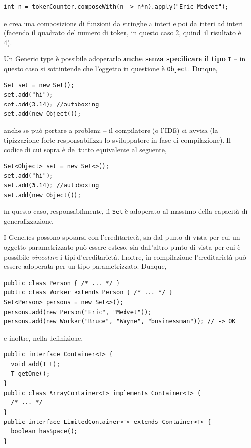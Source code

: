 \documentclass[\fontsizeclass,twocolumn]{\classname}
\let\oldtextsc\textsc
\renewcommand{\textsc}[1]{\oldtextsc{\scfontfs #1}}
\theoremstyle{definition}
\theoremstyle{definition}
\begin{document}
\begin{lstlisting}
int n = tokenCounter.composeWith(n -> n*n).apply("Eric Medvet");
\end{lstlisting}

e crea una composizione di funzioni da stringhe a interi e poi da interi ad
interi (facendo il quadrato del numero di token, in questo caso 2, quindi il
risultato è 4).

Un Generic type è possibile adoperarlo \textbf{anche senza specificare il tipo
\texttt{T}} -- in questo caso si sottintende che l'oggetto in questione è
\texttt{Object}. Dunque,

\begin{lstlisting}
Set set = new Set();
set.add("hi");
set.add(3.14); //autoboxing
set.add(new Object());
\end{lstlisting}

anche se può portare a problemi -- il compilatore (o l'\textsc{IDE}) ci avvisa (la
tipizzazione forte responsabilizza lo sviluppatore in fase di compilazione). Il
codice di cui sopra è del tutto equivalente al seguente,

\begin{lstlisting}
Set<Object> set = new Set<>();
set.add("hi");
set.add(3.14); //autoboxing
set.add(new Object());
\end{lstlisting}

in questo caso, responsabilmente, il \texttt{Set} è adoperato al massimo della
capacità di generalizzazione.

I Generics possono sposarsi con l'ereditarietà, sia dal punto di vista per cui
un oggetto parametrizzato può essere esteso, sia dall'altro punto di vista per
cui è possibile \emph{vincolare} i tipi d'ereditarietà. Inoltre, in
compilazione l'ereditarietà può essere adoperata per un tipo parametrizzato.
Dunque,

\begin{lstlisting}
public class Person { /* ... */ }
public class Worker extends Person { /* ... */ }
Set<Person> persons = new Set<>();
persons.add(new Person("Eric", "Medvet"));
persons.add(new Worker("Bruce", "Wayne", "businessman")); // -> OK
\end{lstlisting}

e inoltre, nella definizione,

\begin{lstlisting}
public interface Container<T> {
  void add(T t);
  T getOne();
}
public class ArrayContainer<T> implements Container<T> {
  /* ... */
}
public interface LimitedContainer<T> extends Container<T> {
  boolean hasSpace();
}
\end{lstlisting}
\end{document}
